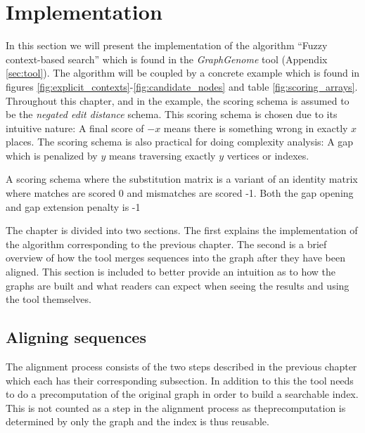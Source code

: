 \documentclass[thesis.tex]{subfiles}
\begin{document}
\chapter{Implementation}
In this section we will present the implementation of the algorithm ``Fuzzy context-based search'' which is found in the \textit{GraphGenome} tool (Appendix \ref{sec:tool}). The algorithm will be coupled by a concrete example which is found in figures \ref{fig:explicit_contexts}-\ref{fig:candidate_nodes} and table \ref{fig:scoring_arrays}. Throughout this chapter, and in the example, the scoring schema is assumed to be the \textit{negated edit distance} schema. This scoring schema is chosen due to its intuitive nature: A final score of $-x$ means there is something wrong in exactly $x$ places. The scoring schema is also practical for doing complexity analysis: A gap which is penalized by $y$ means traversing exactly $y$ vertices or indexes.
\begin{defn}
  A scoring schema where the substitution matrix is a variant of an identity matrix where matches are scored 0 and mismatches are scored -1. Both the gap opening and gap extension penalty is -1
\end{defn}
The chapter is divided into two sections. The first explains the implementation of the algorithm corresponding to the previous chapter. The second is a brief overview of how the tool merges sequences into the graph after they have been aligned. This section is included to better provide an intuition as to how the graphs are built and what readers can expect when seeing the results and using the tool themselves.
\section{Aligning sequences}
The alignment process consists of the two steps described in the previous chapter which each has their corresponding subsection. In addition to this the tool needs to do a precomputation of the original graph in order to build a searchable index. This is not counted as a step in the alignment process as theprecomputation is determined by only the graph and the index is thus reusable.
\end{document}
